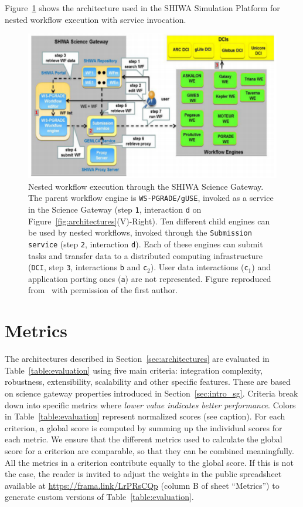 \documentclass[preprint,3p,twocolumn]{elsarticle}
\newcommand{\correction}[1]{\color{blue}#1\color{black}\xspace}
\begin{document}
Figure~\ref{fig:shiwa-architecture} shows the architecture
used in the SHIWA Simulation Platform for nested workflow execution
with service invocation.
\begin{figure}
\centering
\includegraphics[width=1.5\columnwidth]{figures/shiwa-science-gateway.pdf}
\caption{Nested workflow execution through the SHIWA Science Gateway. The
  parent workflow engine is \texttt{WS-PGRADE/gUSE}, invoked as a service
  in the Science Gateway (step \texttt{1}, interaction \texttt{d} on
  Figure~\ref{fig:architectures}(V)-Right). Ten different child engines can be used by nested
  workflows, invoked through the \texttt{Submission service} (step
  \texttt{2}, interaction \texttt{d}). Each of these engines can
  submit tasks and transfer data to a distributed computing
  infrastructure (\texttt{DCI}, step \texttt{3}, interactions
  \texttt{b} and \texttt{c$_2$}). User data interactions (\texttt{c$_1$}) and
  application porting ones (\texttt{a}) are not represented. Figure
  reproduced from~\cite{terstyanszky2014enabling} with permission of
  the first author.}
\label{fig:shiwa-architecture}
\end{figure}


\section{\correction{Metrics}}

\label{sec:metrics}

The architectures described in Section~\ref{sec:architectures} are
evaluated in Table~\ref{table:evaluation} using five main criteria:
integration complexity, robustness, extensibility, scalability and
other specific features. These are based on science gateway properties
introduced in Section~\ref{sec:intro_sg}. Criteria break down into
specific metrics where \emph{lower value indicates better
  performance}. Colors in Table~\ref{table:evaluation} represent
normalized scores (see caption). For each criterion, a global score is
computed by summing up the individual scores for each metric. We
ensure that the different metrics used to calculate the global score
for a criterion are comparable, so that they can be combined
meaningfully. \correction{All the metrics in a criterion contribute
  equally to the global score. If this is not the case, the
  reader is invited to adjust the weights in the public spreadsheet available
  at \url{https://frama.link/LrPRsCQp} (column B of sheet ``Metrics'')
  to generate custom versions of Table~\ref{table:evaluation}.}
\end{document}
